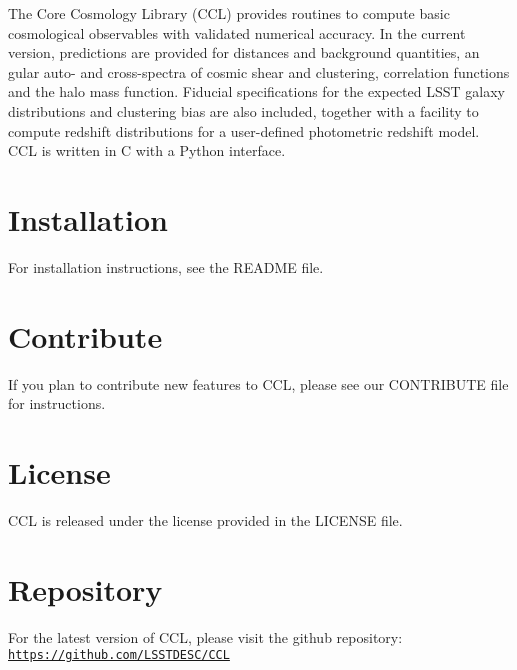 The Core Cosmology Library (C\+CL) provides routines to compute basic cosmological observables with validated numerical accuracy. In the current version, predictions are provided for distances and background quantities, an gular auto-\/ and cross-\/spectra of cosmic shear and clustering, correlation functions and the halo mass function. Fiducial specifications for the expected L\+S\+ST galaxy distributions and clustering bias are also included, together with a facility to compute redshift distributions for a user-\/defined photometric redshift model. C\+CL is written in C with a Python interface.\hypertarget{index_Installation}{}\section{Installation}\label{index_Installation}
For installation instructions, see the R\+E\+A\+D\+ME file.\hypertarget{index_Contribute}{}\section{Contribute}\label{index_Contribute}
If you plan to contribute new features to C\+CL, please see our C\+O\+N\+T\+R\+I\+B\+U\+TE file for instructions.\hypertarget{index_License}{}\section{License}\label{index_License}
C\+CL is released under the license provided in the L\+I\+C\+E\+N\+SE file.\hypertarget{index_Repository}{}\section{Repository}\label{index_Repository}
For the latest version of C\+CL, please visit the github repository\+: \href{https://github.com/LSSTDESC/CCL}{\tt https\+://github.\+com/\+L\+S\+S\+T\+D\+E\+S\+C/\+C\+CL} 